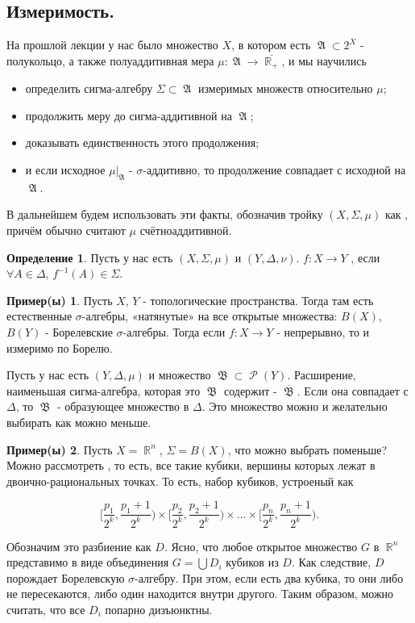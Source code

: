 \documentclass[a4paper]{article}
\theoremstyle{indented}
\theoremstyle{definition}
\newtheorem{defn}{Определение}
\newtheorem{exl}{Пример(ы)}
\theoremstyle{remark}
\DeclareMathOperator{\ra}{\rightarrow}
\DeclareMathOperator{\RR}{\mathbb{R}}
\DeclareMathOperator{\GA}{\mathfrak{A}}
\DeclareMathOperator{\GB}{\mathfrak{B}}
\DeclareMathOperator{\Rho}{\mathcal{P}}
\begin{document}
\subsection{Измеримость.}
 
На прошлой лекции у нас было множество $X$, в котором есть $\GA \subset 2^X$ - полукольцо, а также полуаддитивная мера $\mu : \GA \ra \overline{\RR_+}$, и мы научились 
 
\begin{itemize}
\item определить сигма-алгебру $\Sigma \subset \GA$ измеримых множеств относительно $\mu$; 
\item продолжить меру до сигма-аддитивной на $\GA$; 
\item доказывать единственность этого продолжения; 
\item и если исходное $\mu|_{\GA}$ - $\sigma$-аддитивно, то продолжение совпадает с исходной на $\GA$. 
\end{itemize}
 
В дальнейшем будем использовать эти факты, обозначив тройку $(X, \Sigma, \mu)$ как , причём обычно считают $\mu$ счётноаддитивной.
 
\begin{defn}
Пусть у нас есть $(X, \Sigma, \mu)$ и $(Y, \Delta, \nu)$. $f: X \ra Y$ , если $\forall A \in \Delta$, $f^{-1}(A) \in \Sigma$. 
\end{defn}
 
\begin{exl}
Пусть $X$, $Y$ - топологические пространства. Тогда там есть естественные $\sigma$-алгебры, «натянутые» на все открытые множества: $B(X)$, $B(Y)$ - Борелевские $\sigma$-алгебры. Тогда если $f: X \ra Y$ - непрерывно, то и измеримо по Борелю.
\end{exl}
 
Пусть у нас есть $(Y, \Delta, \mu)$ и множество $\GB \subset \Rho(Y)$. Расширение, наименьшая сигма-алгебра, которая это $\GB$ содержит - $\overline{\GB}$. Если она совпадает с $\Delta$, то $\GB$ - образующее множество в $\Delta$. Это множество можно и желательно выбирать как можно меньше.
 
\begin{exl}
Пусть $X = \RR^n$, $\Sigma = B(X)$, что можно выбрать поменьше? Можно рассмотреть , то есть, все такие кубики, вершины которых лежат в двоично-рациональных точках. То есть, набор кубиков, устроеный как
 
\[
[\frac{p_1}{2^k}, \frac{p_1+1}{2^k}) \times[\frac{p_2}{2^k}, \frac{p_2+1}{2^k}) \times ... \times [\frac{p_n}{2^k}, \frac{p_n+1}{2^k}).
\]
 
Обозначим это разбиение как $D$. Ясно, что любое открытое множество $G$ в $\RR^n$ представимо в виде объединения $G=\bigcup D_i$ кубиков из $D$. Как следствие, $D$ порождает Борелевскую $\sigma$-алгебру. При этом, если есть два кубика, то они либо не пересекаются, либо один находится внутри другого. Таким образом, можно считать, что все $D_i$ попарно дизъюнктны. 
\end{exl}
 
\end{document}
